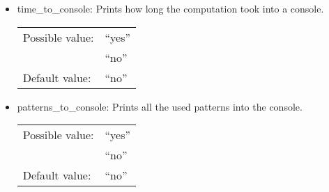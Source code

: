 \begin{itemize}
\item time\_to\_console: Prints how long the computation took into a console.

\begin{tabular}{ll}
Possible value: & ``yes'' \\
& ``no'' \\
Default value: & ``no''
\end{tabular}

\item patterns\_to\_console: Prints all the used patterns into the console.

\begin{tabular}{ll}
Possible value: & ``yes'' \\
& ``no'' \\
Default value: & ``no''
\end{tabular}
\end{itemize}
